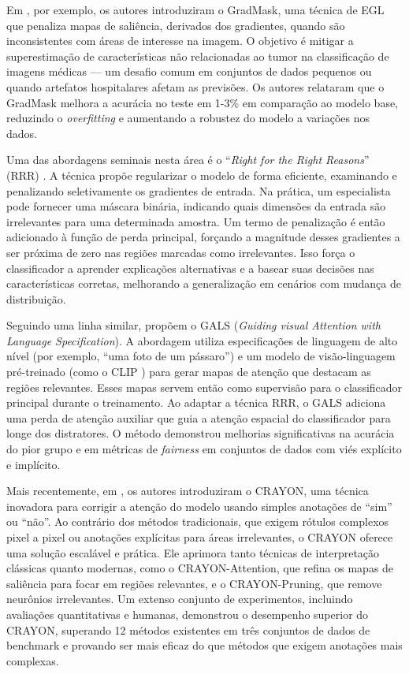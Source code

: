 Em \cite{gradmask}, por exemplo, os autores introduziram o GradMask, uma técnica de EGL que penaliza mapas de saliência, derivados dos gradientes, quando são inconsistentes com áreas de interesse na imagem. O objetivo é mitigar a superestimação de características não relacionadas ao tumor na classificação de imagens médicas — um desafio comum em conjuntos de dados pequenos ou quando artefatos hospitalares afetam as previsões. Os autores relataram que o GradMask melhora a acurácia no teste em 1-3\% em comparação ao modelo base, reduzindo o \textit{overfitting} e aumentando a robustez do modelo a variações nos dados.

Uma das abordagens seminais nesta área é o ``\textit{Right for the Right Reasons}'' (RRR) \cite{rrr}. A técnica propõe regularizar o modelo de forma eficiente, examinando e penalizando seletivamente os gradientes de entrada. Na prática, um especialista pode fornecer uma máscara binária, indicando quais dimensões da entrada são irrelevantes para uma determinada amostra. Um termo de penalização é então adicionado à função de perda principal, forçando a magnitude desses gradientes a ser próxima de zero nas regiões marcadas como irrelevantes. Isso força o classificador a aprender explicações alternativas e a basear suas decisões nas características corretas, melhorando a generalização em cenários com mudança de distribuição.

Seguindo uma linha similar, \cite{gals} propõem o GALS (\textit{Guiding visual Attention with Language Specification}). A abordagem utiliza especificações de linguagem de alto nível (por exemplo, ``uma foto de um pássaro'') e um modelo de visão-linguagem pré-treinado (como o CLIP \cite{clip}) para gerar mapas de atenção que destacam as regiões relevantes. Esses mapas servem então como supervisão para o classificador principal durante o treinamento. Ao adaptar a técnica RRR, o GALS adiciona uma perda de atenção auxiliar que guia a atenção espacial do classificador para longe dos distratores. O método demonstrou melhorias significativas na acurácia do pior grupo e em métricas de \textit{fairness} em conjuntos de dados com viés explícito e implícito.

Mais recentemente, em \cite{crayon}, os autores introduziram o CRAYON, uma técnica inovadora para corrigir a atenção do modelo usando simples anotações de ``sim'' ou ``não''. Ao contrário dos métodos tradicionais, que exigem rótulos complexos pixel a pixel ou anotações explícitas para áreas irrelevantes, o CRAYON oferece uma solução escalável e prática. Ele aprimora tanto técnicas de interpretação clássicas quanto modernas, como o CRAYON-Attention, que refina os mapas de saliência para focar em regiões relevantes, e o CRAYON-Pruning, que remove neurônios irrelevantes. Um extenso conjunto de experimentos, incluindo avaliações quantitativas e humanas, demonstrou o desempenho superior do CRAYON, superando 12 métodos existentes em três conjuntos de dados de benchmark e provando ser mais eficaz do que métodos que exigem anotações mais complexas.

